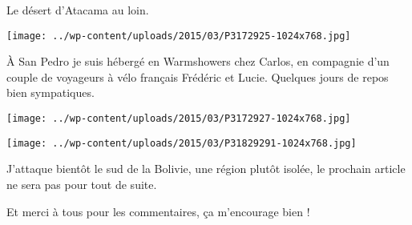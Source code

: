 \pagebreak
 Le désert d'Atacama au loin. 
\begin{center} \texttt{[image: ../wp-content/uploads/2015/03/P3172925-1024x768.jpg]} \end{center}

 \`A San Pedro je suis hébergé en Warmshowers chez Carlos, en compagnie d'un couple de voyageurs à vélo français Frédéric et Lucie. Quelques jours de repos bien sympatiques. 
\begin{center} \texttt{[image: ../wp-content/uploads/2015/03/P3172927-1024x768.jpg]} \end{center}
\begin{center} \texttt{[image: ../wp-content/uploads/2015/03/P31829291-1024x768.jpg]} \end{center}

J'attaque bientôt le sud de la Bolivie, une région plutôt isolée, le prochain article ne sera pas pour tout de suite.

 Et merci à tous pour les commentaires, ça m'encourage bien !